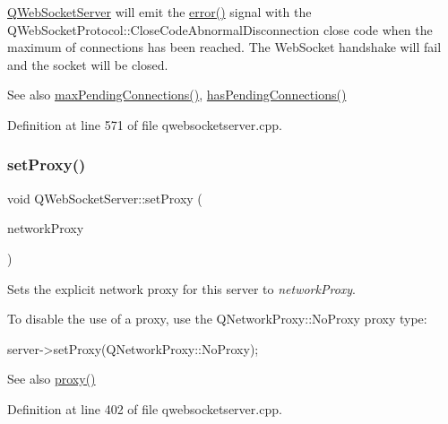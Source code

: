 \mbox{\hyperlink{class_q_web_socket_server}{Q\+Web\+Socket\+Server}} will emit the \mbox{\hyperlink{class_q_web_socket_server_ad7db68dd641e6a5ff0c40b8b4788e1fc}{error()}} signal with the Q\+Web\+Socket\+Protocol\+::\+Close\+Code\+Abnormal\+Disconnection close code when the maximum of connections has been reached. The Web\+Socket handshake will fail and the socket will be closed.

\begin{DoxySeeAlso}{See also}
\mbox{\hyperlink{class_q_web_socket_server_afd3bb35892c8eeaf92ceddc1654c2de7}{max\+Pending\+Connections()}}, \mbox{\hyperlink{class_q_web_socket_server_a90cd25d1e2fb4fdcc3cc7fdb4858db41}{has\+Pending\+Connections()}} 
\end{DoxySeeAlso}


Definition at line 571 of file qwebsocketserver.\+cpp.

\mbox{\label{class_q_web_socket_server_a56705b340b945790676ddebe8225c65e}} 
\subsubsection{\texorpdfstring{set\+Proxy()}{setProxy()}}
{\footnotesize\ttfamily void Q\+Web\+Socket\+Server\+::set\+Proxy (\begin{DoxyParamCaption}\item[{const Q\+Network\+Proxy \&}]{network\+Proxy }\end{DoxyParamCaption})}

Sets the explicit network proxy for this server to {\itshape network\+Proxy}.

To disable the use of a proxy, use the Q\+Network\+Proxy\+::\+No\+Proxy proxy type\+:


\begin{DoxyCode}
server->setProxy(QNetworkProxy::NoProxy);
\end{DoxyCode}


\begin{DoxySeeAlso}{See also}
\mbox{\hyperlink{class_q_web_socket_server_ae7b37544dd4e6490d777ed4f5e0699ad}{proxy()}} 
\end{DoxySeeAlso}


Definition at line 402 of file qwebsocketserver.\+cpp.

\mbox{\label{class_q_web_socket_server_af8425750d42f210de95cfbb6ad4c287a}} 
